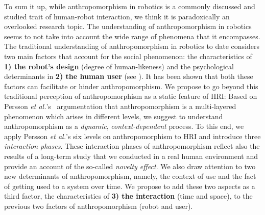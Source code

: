 \documentclass[lettersize, apacite, twoside, HRI]{apa_HRI}
\begin{document}
To sum it up, while anthropomorphism in robotics is a commonly discussed and studied trait of human-robot interaction, we think it is paradoxically an overlooked research topic. The understanding of anthropomorphism in robotics seems to not take into account the wide range of phenomena that it encompasses. The traditional understanding of anthropomorphism in robotics to date considers two main factors that account for the social phenomenon: the characteristics of \textbf{1) the robot's design} (degree of human-likeness) and the psychological determinants in \textbf{2) the human user} (see \cite{epley_seeing_2007}). It has been shown that both these factors can facilitate or hinder anthropomorphism. We propose to go beyond this traditional perception of anthropomorphism as a static feature of HRI: Based on Persson \textit{et al.}'s~\cite{persson_anthropomorphism_2000} argumentation that anthropomorphism is a multi-layered phenomenon which arises in different levels, we suggest to understand anthropomorphism as a \emph{dynamic}, \emph{context-dependent} process. To this end, we apply Persson \textit{et al.}'s six levels on anthropomorphism to HRI and introduce three \emph{interaction phases}. These interaction phases of anthropomorphism reflect also the results of a long-term study that we conducted in a real human environment and provide an account of the so-called \textit{novelty effect}. We also draw attention to two new determinants of anthropomorphism, namely, the context of use and the fact of getting used to a system over time. We propose to add these two aspects as a third factor, the characteristics of \textbf{3) the interaction} (time and space), to the previous two factors of anthropomorphism (robot and user). 


	
\end{document}

